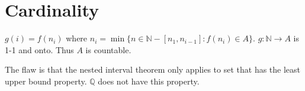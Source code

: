 \section{Cardinality}

\begin{solution}
  $g(i) = f(n_{i})$ where $n_{i} = \min\{n \in \mathbb{N} - [n_{1}, n_{i - 1}] : f(n_{i}) \in A\}$.
  $g: \mathbb{N} \rightarrow A$ is 1-1 and onto. Thus $A$ is countable. 
\end{solution}

\begin{solution}

  The flaw is that the nested interval theorem only applies to set that has the least upper bound property.
  $\mathbb{Q}$ does not have this property.
\end{solution}

